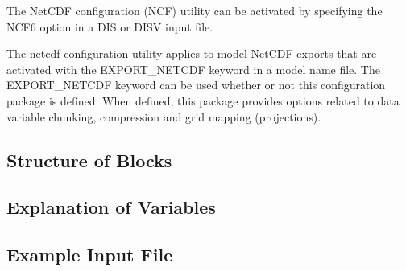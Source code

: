 The NetCDF configuration (NCF) utility can be activated by specifying the NCF6 option in a DIS or DISV input file.

The netcdf configuration utility applies to model NetCDF exports that are activated with the EXPORT\_NETCDF keyword in a model name file. The EXPORT\_NETCDF keyword can be used whether or not this configuration package is defined. When defined, this package provides options related to data variable chunking, compression and grid mapping (projections).

\vspace{5mm}
\subsection{Structure of Blocks}


\vspace{5mm}
\subsection{Explanation of Variables}
\begin{description}

\end{description}

\vspace{5mm}
\subsection{Example Input File}


